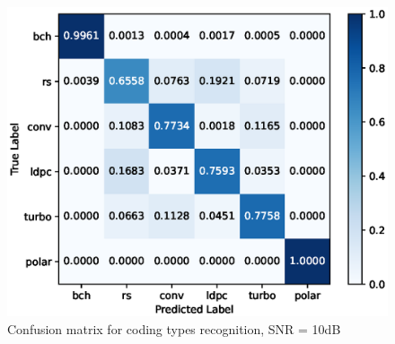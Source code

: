 \documentclass[conference]{IEEEtran}
\begin{document}

\begin{figure}[htbp]
	\centerline{\includegraphics[scale=0.6]{confusion-type.eps}}
	\caption{Confusion matrix for coding types recognition, SNR = 10dB}%
\end{figure}
\end{document}
